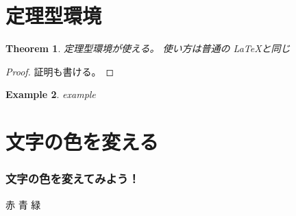 \documentclass[dvipdfmx,cjk]{beamer}
\newtheorem{thm}{Theorem}[section]
\theoremstyle{example}
\newtheorem{exam}[thm]{Example}
\begin{document}
\section{定理型環境}
\begin{frame} %
\begin{thm}
定理型環境が使える。
使い方は普通の \LaTeX と同じ
\end{thm}
\pause

\begin{proof}
証明も書ける。
\end{proof}
\pause

\begin{exam}
example
\end{exam}
\end{frame}

\section{文字の色を変える}             %
\begin{frame}
\frametitle{文字の色を変えてみよう！}
{\color{red}赤}\pause
{\color{blue}青}\pause
{\color{green}緑}
\end{frame}
\end{document}
